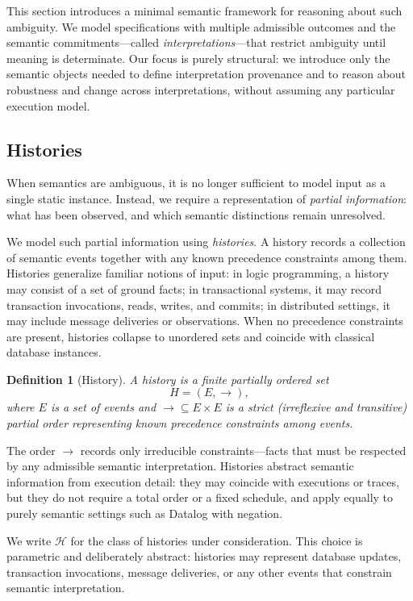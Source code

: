 \documentclass[acmsmall,nonacm]{acmart}
\newtheorem{definition}{Definition}
\theoremstyle{remark}
\numberwithin{definition}{section}
\numberwithin{theorem}{section}
\numberwithin{lemma}{section}
\numberwithin{corollary}{section}
\numberwithin{remark}{section}
\numberwithin{example}{section}
\numberwithin{observation}{section}
\numberwithin{assumption}{section}
\newcommand{\Hist}{\mathcal{H}}
\begin{document}
This section introduces a minimal semantic framework for reasoning about such
ambiguity.
We model specifications with multiple admissible outcomes and the semantic
commitments—called \emph{interpretations}—that restrict ambiguity until meaning
is determinate.
Our focus is purely structural: we introduce only the semantic objects needed to
define interpretation provenance and to reason about robustness and change across
interpretations, without assuming any particular execution model.

\subsection{Histories}

When semantics are ambiguous, it is no longer sufficient to model input as a
single static instance.
Instead, we require a representation of \emph{partial information}: what has
been observed, and which semantic distinctions remain unresolved.

We model such partial information using \emph{histories}.
A history records a collection of semantic events together with any known
precedence constraints among them.
Histories generalize familiar notions of input:
in logic programming, a history may consist of a set of ground facts;
in transactional systems, it may record transaction invocations, reads, writes,
and commits; in distributed settings, it may include message deliveries or
observations.
When no precedence constraints are present, histories collapse to unordered
sets and coincide with classical database instances.

\begin{definition}[History]
A \emph{history} is a finite partially ordered set
\[
  H = (E, \rightarrow),
\]
where $E$ is a set of events and $\rightarrow \subseteq E \times E$ is a strict
(irreflexive and transitive) partial order representing known precedence constraints among events.
\end{definition}

The order $\rightarrow$ records only irreducible constraints—facts that must be
respected by any admissible semantic interpretation.
Histories abstract semantic information from execution detail: they may coincide
with executions or traces, but they do not require a total order or a fixed
schedule, and apply equally to purely semantic settings such as Datalog with
negation.

We write $\Hist$ for the class of histories under consideration.
This choice is parametric and deliberately abstract: histories may represent
database updates, transaction invocations, message deliveries, or any other
events that constrain semantic interpretation.
\end{document}
